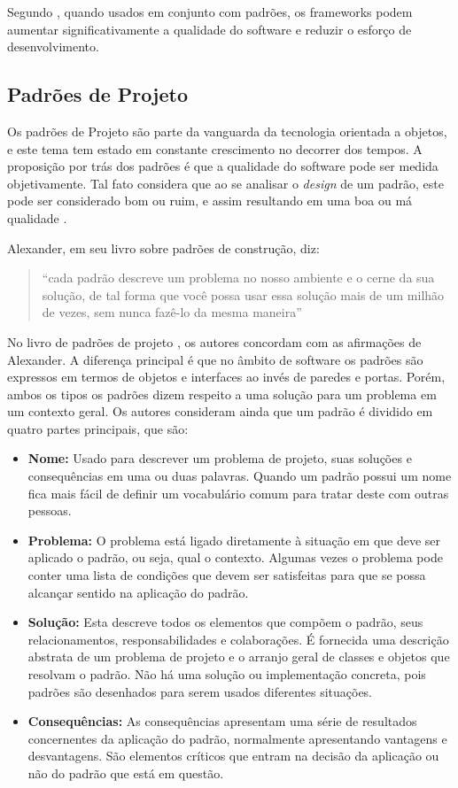 Segundo \cite{Fayad:Schimidt:1997}, quando usados em conjunto com padrões, os frameworks podem aumentar significativamente a qualidade do software e reduzir o esforço de desenvolvimento.

\subsection{Padrões de Projeto}

Os padrões de Projeto são parte da vanguarda da tecnologia orientada a objetos, e este tema tem estado em constante crescimento no decorrer dos tempos. A proposição por trás dos padrões é que a qualidade do software pode ser medida objetivamente. Tal fato considera que ao se analisar o \textit{design} de um padrão, este pode ser considerado bom ou ruim, e assim resultando em uma boa ou má qualidade \cite{Shalloway:Trott:2004}.

Alexander, em seu livro \cite{Alexander:1979} sobre padrões de construção, diz:

\begin{quote}
	``cada padrão descreve um problema no nosso
ambiente e o cerne da sua solução, de tal forma que você possa usar essa solução mais
de um milhão de vezes, sem nunca fazê-lo da mesma maneira''
\end{quote}

No livro de padrões de projeto \cite{Gamma:Helm:Johnson:Vlissides:1995}, os autores concordam com as afirmações de Alexander. A diferença principal é que no âmbito de software os padrões são expressos em termos de objetos e interfaces ao invés de paredes e portas. Porém, ambos os tipos os padrões dizem respeito a uma solução para um problema em um contexto geral. Os autores consideram ainda que um padrão é dividido em quatro partes principais, que são:

\begin{itemize}
	\item \textbf{Nome:} Usado para descrever um problema de projeto, suas soluções e consequências em uma ou duas palavras. Quando um padrão possui um nome fica mais fácil de definir um vocabulário comum para tratar deste com outras pessoas.
	\item \textbf{Problema:} O problema está ligado diretamente à situação em que deve ser aplicado o padrão, ou seja, qual o contexto. Algumas vezes o problema pode conter uma lista de condições que devem ser satisfeitas para que se possa alcançar sentido na aplicação do padrão.
	\item \textbf{Solução:} Esta descreve todos os elementos que compõem o padrão, seus relacionamentos, responsabilidades e colaborações. É fornecida uma descrição abstrata de um problema de projeto e o arranjo geral de classes e objetos que resolvam o padrão. Não há uma solução ou implementação concreta, pois padrões são desenhados para serem usados diferentes situações.
	\item \textbf{Consequências:} As consequências apresentam uma série de resultados concernentes da aplicação do padrão, normalmente apresentando vantagens e desvantagens. São elementos críticos que entram na decisão da aplicação ou não do padrão que está em questão.
\end{itemize}

